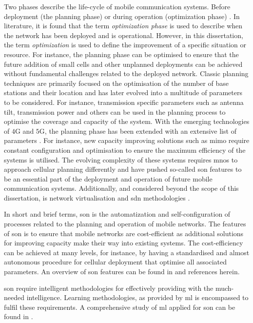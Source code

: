 Two phases describe the life-cycle of mobile communication systems. Before deployment (the planning phase) or during operation (optimization phase) \cite{Taufique2017}. In literature, it is found that the term \emph{optimization phase} is used to describe when the network has been deployed and is operational. However, in this dissertation, the term \emph{optimization} is used to define the improvement of a specific situation or resource. For instance, the planning phase can be optimised to ensure that the future addition of small cells and other unplanned deployments can be achieved without fundamental challenges related to the deployed network. Classic planning techniques are primarily focused on the optimisation of the number of base stations and their location and has later evolved into a multitude of parameters to be considered. For instance, transmission specific parameters such as antenna tilt, transmission power and others can be used in the planning process to optimise the coverage and capacity of the system. With the emerging technologies of $4$G and $5$G, the planning phase has been extended with an extensive list of parameters  \cite{Taufique2017}. For instance, new capacity improving solutions such as \gls{mimo} require constant configuration and optimisation to ensure the maximum efficiency of the systems is utilised. The evolving complexity of these systems requires \glspl{mno} to approach cellular planning differently and have pushed so-called \gls{son} features to be an essential part of the deployment and operation of future mobile communication systems. Additionally, and considered beyond the scope of this dissertation, is network virtualisation and \gls{sdn} methodologies  \cite{Taufique2017}.


In short and brief terms, \gls{son} is the automatization and self-configuration of processes related to the planning and operation of mobile networks. The features of \gls{son} is to ensure that mobile networks are cost-efficient as additional solutions for improving capacity make their way into existing systems. The cost-efficiency can be achieved at many levels, for instance, by having a standardised and almost autonomous procedure for cellular deployment that optimise all associated parameters. An overview of \gls{son} features can be found in \cite{Jorguseski2014Self-organizingTrends} and references herein.

\acrlong{son} require intelligent methodologies for effectively providing with the much-needed intelligence. Learning methodologies, as provided by \acrfull{ml} is encompassed to fulfil these requirements. A comprehensive study of \gls{ml} applied for \gls{son} can be found in \cite{Klaine2017ANetworks}. 

